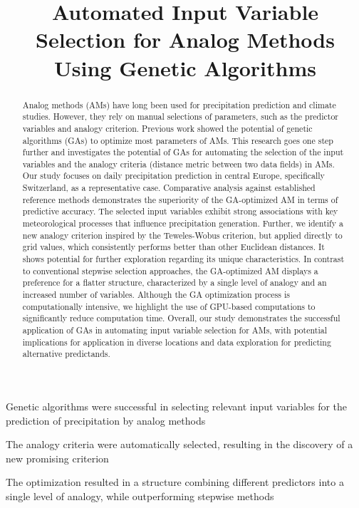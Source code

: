 \documentclass[draft]{agujournal2019}
\begin{document}
\title{Automated Input Variable Selection for Analog Methods Using Genetic Algorithms}





\begin{keypoints}
\item Genetic algorithms were successful in selecting relevant input variables for the prediction of precipitation by analog methods
\item The analogy criteria were automatically selected, resulting in the discovery of a new promising criterion
\item The optimization resulted in a structure combining different predictors into a single level of analogy, while outperforming stepwise methods
\end{keypoints}


\begin{abstract}

Analog methods (AMs) have long been used for precipitation prediction and climate studies. However, they rely on manual selections of parameters, such as the predictor variables and analogy criterion. Previous work showed the potential of genetic algorithms (GAs) to optimize most parameters of AMs. This research goes one step further and investigates the potential of GAs for automating the selection of the input variables and the analogy criteria (distance metric between two data fields) in AMs. Our study focuses on daily precipitation prediction in central Europe, specifically Switzerland, as a representative case.  
Comparative analysis against established reference methods demonstrates the superiority of the GA-optimized AM in terms of predictive accuracy. The selected input variables exhibit strong associations with key meteorological processes that influence precipitation generation. Further, we identify a new analogy criterion inspired by the Teweles-Wobus criterion, but applied directly to grid values, which consistently performs better than other Euclidean distances. It shows potential for further exploration regarding its unique characteristics. In contrast to conventional stepwise selection approaches, the GA-optimized AM displays a preference for a flatter structure, characterized by a single level of analogy and an increased number of variables.
Although the GA optimization process is computationally intensive, we highlight the use of GPU-based computations to significantly reduce computation time. Overall, our study demonstrates the successful application of GAs in automating input variable selection for AMs, with potential implications for application in diverse locations and data exploration for predicting alternative predictands.


\end{abstract}
\end{document}
